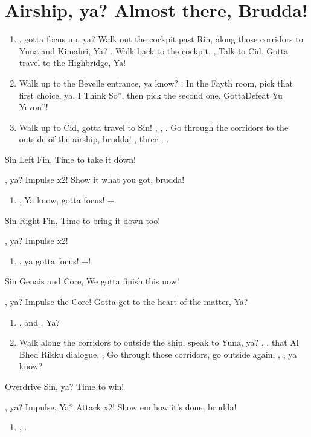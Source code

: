 \chapter{Airship, ya? Almost there, Brudda!}
\begin{enumerate}
\item \sd, gotta focus up, ya? Walk out the cockpit past Rin, along those corridors to Yuna and Kimahri, Ya? \sd. Walk back to the cockpit, \sd, Talk to Cid, Gotta travel to the Highbridge, Ya!
\item Walk up to the Bevelle entrance, ya know? \sd. In the Fayth room, pick that first choice, ya, I Think So'', then pick the second one, GottaDefeat Yu Yevon''!
\item Walk up to Cid, gotta travel to Sin! \sd, \skippablefmv, \sd. Go through the corridors to the outside of the airship, brudda! \sd, three \skippablefmv[2:10], \sd.
\end{enumerate}
\begin{battle}[65000]{Sin Left Fin, Time to take it down!}
\begin{itemize}
\summon{\bahamut}, ya?
\bahamutf Impulse x2! Show it what you got, brudda!
\end{itemize}
\end{battle}
\begin{enumerate}[resume]
\item \sd, Ya know, gotta focus! \cs+\skippablefmv.
\end{enumerate}
\begin{battle}[65000]{Sin Right Fin, Time to bring it down too!}
\begin{itemize}
\summon{\bahamut}, ya?
\bahamutf Impulse x2!
\end{itemize}
\end{battle}
\begin{enumerate}[resume]
\item \sd, ya gotta focus! \cs+\skippablefmv!
\end{enumerate}
\begin{battle}[56000]{Sin Genais and Core, We gotta finish this now!}
\begin{itemize}
\summon{\bahamut}, ya?
\bahamutf Impulse the Core! Gotta get to the heart of the matter, Ya?
\end{itemize}
\end{battle}
\begin{enumerate}[resume]
\item \sd, and \skippablefmv, Ya?
\item Walk along the corridors to outside the ship, speak to Yuna, ya? \cs[1:40], \sd, that Al Bhed Rikku dialogue, \skippablefmv, Go through those corridors, go outside again, \skippablefmv, \sd, ya know?
\end{enumerate}
\begin{battle}[140000]{Overdrive Sin, ya? Time to win!}
\begin{itemize}
\summon{\bahamut}, ya?
\bahamutf Impulse, Ya?
\bahamutf Attack x2! Show em how it's done, brudda!
\end{itemize}
\end{battle}
\begin{enumerate}[resume]
\item \skippablefmv[1:20], \sd.
\end{enumerate}
